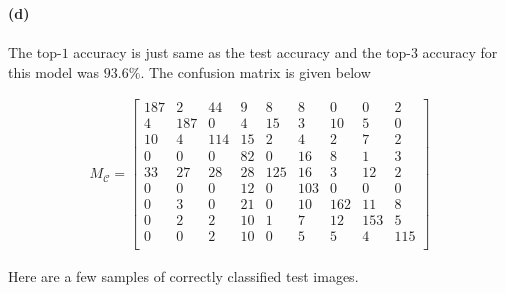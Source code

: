 \begin{homeworkProblem}
\pagebreak

\textbf{(d)}
\\
\\
The top-$1$ accuracy is just same as the test accuracy and the top-$3$ accuracy
for this model was $93.6\%$. The confusion matrix is given below

  \begin{align*}
    M_\mathcal{C} = \begin{bmatrix}
      187 & 2 & 44 & 9 & 8 & 8 & 0 & 0 & 2 \\
      4 & 187 & 0 & 4 & 15 & 3 & 10 & 5 & 0 \\
      10 & 4 & 114 & 15 & 2 & 4 & 2 & 7 & 2 \\
      0 & 0 & 0 & 82 & 0 & 16 & 8 & 1 & 3 \\
      33 & 27 & 28 & 28 & 125 & 16 & 3 & 12 & 2 \\
      0 & 0 & 0 & 12 & 0 & 103 & 0 & 0 & 0 \\
      0 & 3 & 0 & 21 & 0 & 10 & 162 & 11 & 8 \\
      0 & 2 & 2 & 10 & 1 & 7 & 12 & 153 & 5 \\
      0 & 0 & 2 & 10 & 0 & 5 & 5 & 4 & 115 \\
    \end{bmatrix}
  \end{align*}

  Here are a few samples of correctly classified test images.


\end{homeworkProblem}

